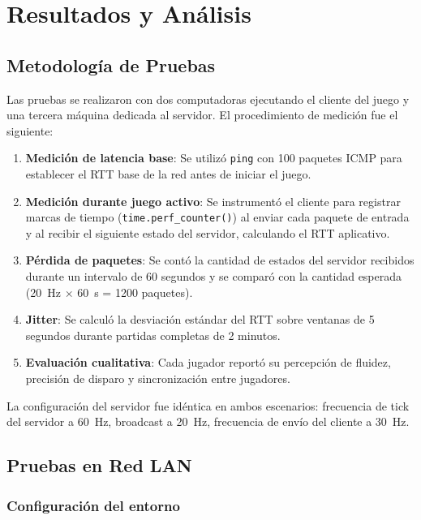 \documentclass[conference]{IEEEtran}
\begin{document}
\section{Resultados y An\'alisis}

\subsection{Metodolog\'ia de Pruebas}

Las pruebas se realizaron con dos computadoras ejecutando el cliente del juego y una tercera m\'aquina dedicada al servidor. El procedimiento de medici\'on fue el siguiente:

\begin{enumerate}
    \item \textbf{Medici\'on de latencia base}: Se utiliz\'o \texttt{ping} con 100 paquetes ICMP para establecer el RTT base de la red antes de iniciar el juego.
    \item \textbf{Medici\'on durante juego activo}: Se instrument\'o el cliente para registrar marcas de tiempo (\texttt{time.perf\_counter()}) al enviar cada paquete de entrada y al recibir el siguiente estado del servidor, calculando el RTT aplicativo.
    \item \textbf{P\'erdida de paquetes}: Se cont\'o la cantidad de estados del servidor recibidos durante un intervalo de 60 segundos y se compar\'o con la cantidad esperada (20~Hz $\times$ 60~s = 1200 paquetes).
    \item \textbf{Jitter}: Se calcul\'o la desviaci\'on est\'andar del RTT sobre ventanas de 5 segundos durante partidas completas de 2 minutos.
    \item \textbf{Evaluaci\'on cualitativa}: Cada jugador report\'o su percepci\'on de fluidez, precisi\'on de disparo y sincronizaci\'on entre jugadores.
\end{enumerate}

La configuraci\'on del servidor fue id\'entica en ambos escenarios: frecuencia de tick del servidor a 60~Hz, broadcast a 20~Hz, frecuencia de env\'io del cliente a 30~Hz.

\subsection{Pruebas en Red LAN}

\subsubsection{Configuraci\'on del entorno}
\end{document}
